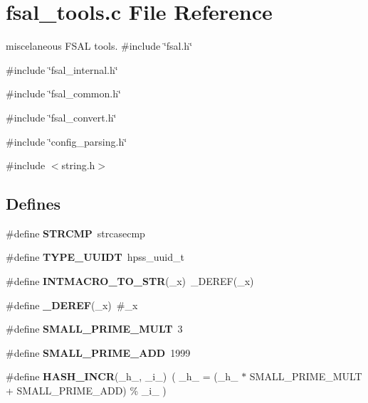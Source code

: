 \section{fsal\_\-tools.c File Reference}
\label{fsal__tools_8c}


miscelaneous FSAL tools.  
{\ttfamily \#include \char`\"{}fsal.h\char`\"{}}\par
{\ttfamily \#include \char`\"{}fsal\_\-internal.h\char`\"{}}\par
{\ttfamily \#include \char`\"{}fsal\_\-common.h\char`\"{}}\par
{\ttfamily \#include \char`\"{}fsal\_\-convert.h\char`\"{}}\par
{\ttfamily \#include \char`\"{}config\_\-parsing.h\char`\"{}}\par
{\ttfamily \#include $<$string.h$>$}\par
\subsection*{Defines}
\begin{DoxyCompactItemize}
\item 
\#define {\bfseries STRCMP}~strcasecmp\label{fsal__tools_8c_a1ffef5879101d778f17a377e0d8b0e00}

\item 
\#define {\bfseries TYPE\_\-UUIDT}~hpss\_\-uuid\_\-t\label{fsal__tools_8c_a0415c5edcfceb55c37efa38c2c6e2212}

\item 
\#define {\bfseries INTMACRO\_\-TO\_\-STR}(\_\-x)~\_\-DEREF(\_\-x)\label{fsal__tools_8c_add61491cf401fcb9733a455efc468350}

\item 
\#define {\bfseries \_\-DEREF}(\_\-x)~\#\_\-x\label{fsal__tools_8c_a565798781a048652bd416393d92c00fa}

\item 
\#define {\bfseries SMALL\_\-PRIME\_\-MULT}~3\label{fsal__tools_8c_a95706123588ac755c4ed3b5d78dcd72b}

\item 
\#define {\bfseries SMALL\_\-PRIME\_\-ADD}~1999\label{fsal__tools_8c_a8b2eea7185994e4333b75f02231a8d7b}

\item 
\#define {\bfseries HASH\_\-INCR}(\_\-h\_\-, \_\-i\_\-)~( \_\-h\_\- = (\_\-h\_\- $\ast$ SMALL\_\-PRIME\_\-MULT + SMALL\_\-PRIME\_\-ADD) \% \_\-i\_\- )\label{fsal__tools_8c_a3e856864aba497e6b22de127c7b7ad2b}

\end{DoxyCompactItemize}
